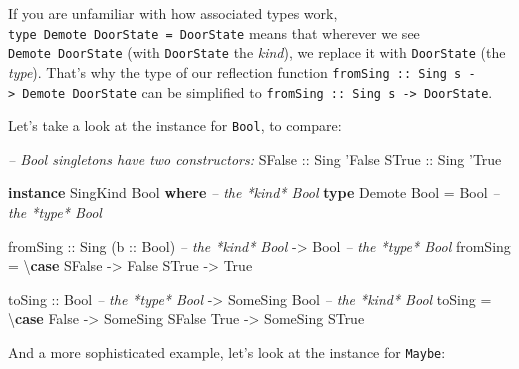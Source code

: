 \documentclass[]{article}
\newenvironment{Shaded}{}{}
\newcommand{\KeywordTok}[1]{\textcolor[rgb]{0.00,0.44,0.13}{\textbf{#1}}}
\newcommand{\DataTypeTok}[1]{\textcolor[rgb]{0.56,0.13,0.00}{#1}}
\newcommand{\CharTok}[1]{\textcolor[rgb]{0.25,0.44,0.63}{#1}}
\newcommand{\CommentTok}[1]{\textcolor[rgb]{0.38,0.63,0.69}{\textit{#1}}}
\newcommand{\OtherTok}[1]{\textcolor[rgb]{0.00,0.44,0.13}{#1}}
\newcommand{\FunctionTok}[1]{\textcolor[rgb]{0.02,0.16,0.49}{#1}}
\newcommand{\NormalTok}[1]{#1}
\begin{document}
If you are unfamiliar with how associated types work,
\texttt{type\ Demote\ DoorState\ =\ DoorState} means that wherever we see
\texttt{Demote\ DoorState} (with \texttt{DoorState} the \emph{kind}), we replace
it with \texttt{DoorState} (the \emph{type}). That's why the type of our
reflection function
\texttt{fromSing\ ::\ Sing\ s\ -\textgreater{}\ Demote\ DoorState} can be
simplified to \texttt{fromSing\ ::\ Sing\ s\ -\textgreater{}\ DoorState}.

Let's take a look at the instance for \texttt{Bool}, to compare:

\begin{Shaded}
\begin{Highlighting}[]
\CommentTok{-- Bool singletons have two constructors:}
\DataTypeTok{SFalse}\OtherTok{ ::} \DataTypeTok{Sing} \CharTok{'False}
\DataTypeTok{STrue}\OtherTok{  ::} \DataTypeTok{Sing} \CharTok{'True}

\KeywordTok{instance} \DataTypeTok{SingKind} \DataTypeTok{Bool} \KeywordTok{where}    \CommentTok{-- the *kind* Bool}
    \KeywordTok{type} \DataTypeTok{Demote} \DataTypeTok{Bool} \FunctionTok{=} \DataTypeTok{Bool}     \CommentTok{-- the *type* Bool}

\NormalTok{    fromSing}
\OtherTok{        ::} \DataTypeTok{Sing}\NormalTok{ (}\OtherTok{b ::} \DataTypeTok{Bool}\NormalTok{)        }\CommentTok{-- the *kind* Bool}
        \OtherTok{->} \DataTypeTok{Bool}                    \CommentTok{-- the *type* Bool}
\NormalTok{    fromSing }\FunctionTok{=}\NormalTok{ \textbackslash{}}\KeywordTok{case}
        \DataTypeTok{SFalse} \OtherTok{->} \DataTypeTok{False}
        \DataTypeTok{STrue}  \OtherTok{->} \DataTypeTok{True}

\NormalTok{    toSing}
\OtherTok{        ::} \DataTypeTok{Bool}                    \CommentTok{-- the *type* Bool}
        \OtherTok{->} \DataTypeTok{SomeSing} \DataTypeTok{Bool}           \CommentTok{-- the *kind* Bool}
\NormalTok{    toSing }\FunctionTok{=}\NormalTok{ \textbackslash{}}\KeywordTok{case}
        \DataTypeTok{False} \OtherTok{->} \DataTypeTok{SomeSing} \DataTypeTok{SFalse}
        \DataTypeTok{True}  \OtherTok{->} \DataTypeTok{SomeSing} \DataTypeTok{STrue}
\end{Highlighting}
\end{Shaded}

And a more sophisticated example, let's look at the instance for \texttt{Maybe}:
\end{document}
